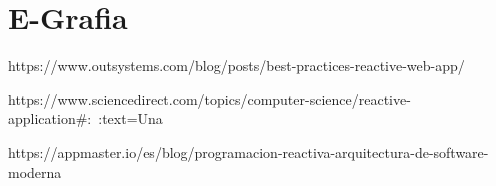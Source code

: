 \documentclass[12pt,letterpaper]{article}
\begin{document}
\section*{E-Grafia}
https://www.outsystems.com/blog/posts/best-practices-reactive-web-app/

https://www.sciencedirect.com/topics/computer-science/reactive-application#:~:text=Una%

https://appmaster.io/es/blog/programacion-reactiva-arquitectura-de-software-moderna
\end{document}
